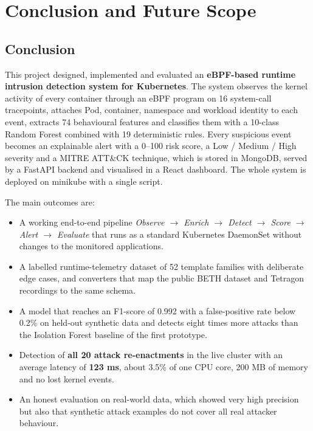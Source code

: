 \chapter{Conclusion and Future Scope}

\section{Conclusion}

This project designed, implemented and evaluated an \textbf{eBPF-based runtime
intrusion detection system for Kubernetes}. The system observes the kernel activity of
every container through an eBPF program on 16 system-call tracepoints, attaches Pod,
container, namespace and workload identity to each event, extracts 74 behavioural
features and classifies them with a 10-class Random Forest combined with 19
deterministic rules. Every suspicious event becomes an explainable alert with a 0--100
risk score, a Low / Medium / High severity and a MITRE ATT\&CK technique, which is
stored in MongoDB, served by a FastAPI backend and visualised in a React dashboard. The
whole system is deployed on minikube with a single script.

The main outcomes are:
\begin{itemize}
    \item A working end-to-end pipeline \emph{Observe $\rightarrow$ Enrich $\rightarrow$
          Detect $\rightarrow$ Score $\rightarrow$ Alert $\rightarrow$ Evaluate} that runs as
          a standard Kubernetes DaemonSet without changes to the monitored applications.
    \item A labelled runtime-telemetry dataset of 52 template families with deliberate
          edge cases, and converters that map the public BETH dataset and Tetragon
          recordings to the same schema.
    \item A model that reaches an F1-score of 0.992 with a false-positive rate below
          0.2\% on held-out synthetic data and detects eight times more attacks than the
          Isolation Forest baseline of the first prototype.
    \item Detection of \textbf{all 20 attack re-enactments} in the live cluster with an
          average latency of \textbf{123 ms}, about 3.5\% of one CPU core, 200 MB of
          memory and no lost kernel events.
    \item An honest evaluation on real-world data, which showed very high precision but
          also that synthetic attack examples do not cover all real attacker behaviour.
\end{itemize}

